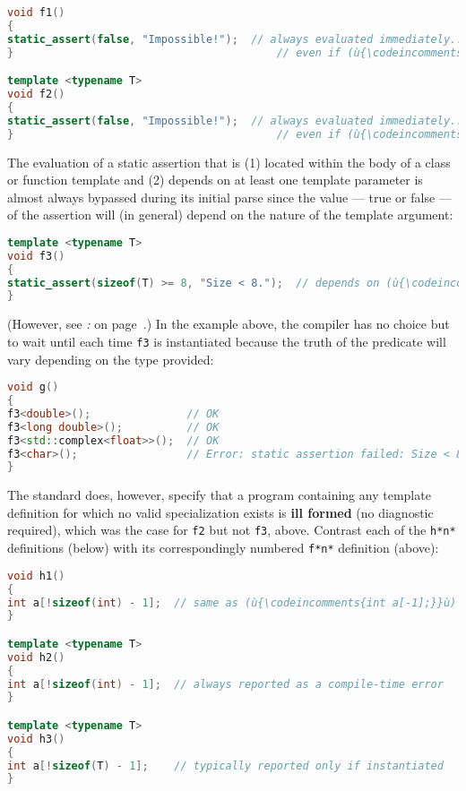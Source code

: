 \begin{lstlisting}[language=C++]
void f1()
{
static_assert(false, "Impossible!");  // always evaluated immediately...
}                                         // even if (ù{\codeincomments{f1()}}ù) is never invoked

template <typename T>
void f2()
{
static_assert(false, "Impossible!");  // always evaluated immediately...
}                                         // even if (ù{\codeincomments{f2()}}ù) is never instantiated
\end{lstlisting}

\noindent The evaluation of a static assertion that is (1) located within the
body of a class or function template and (2) depends on at least one
template parameter is almost always bypassed during its initial parse since
the value --- true or false --- of the assertion will (in general) depend on the nature
of the template argument:

\begin{lstlisting}[language=C++]
template <typename T>
void f3()
{
static_assert(sizeof(T) >= 8, "Size < 8.");  // depends on (ù{\codeincomments{T}}ù)
}
\end{lstlisting}

\noindent (However, see {\it{}: } on page~\pageref{static-potential-pitfalls}.) In the example above, the compiler has no choice but to wait until each
time \texttt{f3} is instantiated because the truth of the predicate will
vary depending on the type provided:

\begin{lstlisting}[language=C++]
void g()
{
f3<double>();               // OK
f3<long double>();          // OK
f3<std::complex<float>>();  // OK
f3<char>();                 // Error: static assertion failed: Size < 8.
}
\end{lstlisting}

\noindent The standard does, however, specify that a program containing any
template definition for which no valid specialization exists is
\textbf{ill formed} (no diagnostic required), which was the case for
\texttt{f2} but not \texttt{f3}, above. Contrast each of the
\texttt{h*n*} definitions (below) with its correspondingly numbered
\texttt{f*n*} definition (above):

\begin{lstlisting}[language=C++]
void h1()
{
int a[!sizeof(int) - 1];  // same as (ù{\codeincomments{int a[-1];}}ù) and is ill formed
}

template <typename T>
void h2()
{
int a[!sizeof(int) - 1];  // always reported as a compile-time error
}

template <typename T>
void h3()
{
int a[!sizeof(T) - 1];    // typically reported only if instantiated
}
\end{lstlisting}

